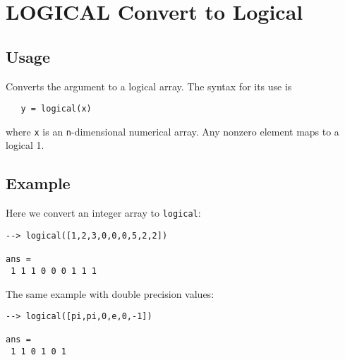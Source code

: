 \section{LOGICAL Convert to Logical}

\subsection{Usage}

Converts the argument to a logical array.  The syntax
for its use is
\begin{verbatim}
   y = logical(x)
\end{verbatim}
where \verb|x| is an \verb|n|-dimensional numerical array.  Any nonzero 
element maps to a logical 1.
\subsection{Example}

Here we convert an integer array to \verb|logical|:
\begin{verbatim}
--> logical([1,2,3,0,0,0,5,2,2])

ans = 
 1 1 1 0 0 0 1 1 1 
\end{verbatim}
The same example with double precision values:
\begin{verbatim}
--> logical([pi,pi,0,e,0,-1])

ans = 
 1 1 0 1 0 1 
\end{verbatim}
